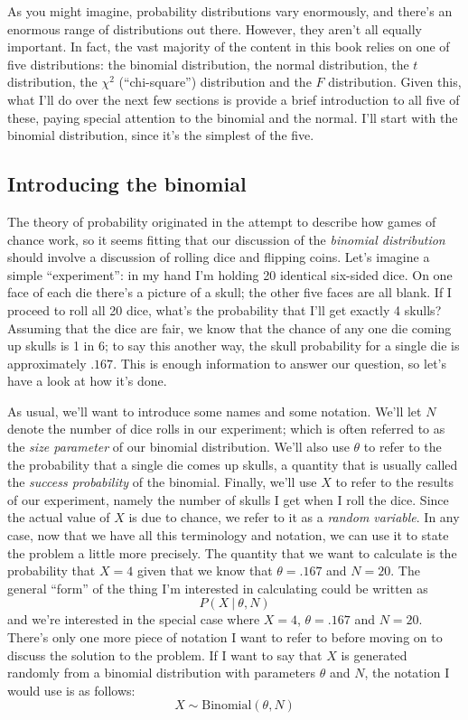 \documentclass[
  letterpaper,
  DIV=11,
  numbers=noendperiod]{scrreprt}
\begin{document}
As you might imagine, probability distributions vary enormously, and
there's an enormous range of distributions out there. However, they
aren't all equally important. In fact, the vast majority of the content
in this book relies on one of five distributions: the binomial
distribution, the normal distribution, the \(t\) distribution, the
\(\chi^2\) (``chi-square'') distribution and the \(F\) distribution.
Given this, what I'll do over the next few sections is provide a brief
introduction to all five of these, paying special attention to the
binomial and the normal. I'll start with the binomial distribution,
since it's the simplest of the five.

\subsection{Introducing the binomial}\label{introducing-the-binomial}

The theory of probability originated in the attempt to describe how
games of chance work, so it seems fitting that our discussion of the
\emph{binomial distribution} should involve a discussion of rolling dice
and flipping coins. Let's imagine a simple ``experiment'': in my hand
I'm holding 20 identical six-sided dice. On one face of each die there's
a picture of a skull; the other five faces are all blank. If I proceed
to roll all 20 dice, what's the probability that I'll get exactly 4
skulls? Assuming that the dice are fair, we know that the chance of any
one die coming up skulls is 1 in 6; to say this another way, the skull
probability for a single die is approximately \(.167\). This is enough
information to answer our question, so let's have a look at how it's
done.

As usual, we'll want to introduce some names and some notation. We'll
let \(N\) denote the number of dice rolls in our experiment; which is
often referred to as the \emph{size parameter} of our binomial
distribution. We'll also use \(\theta\) to refer to the the probability
that a single die comes up skulls, a quantity that is usually called the
\emph{success probability} of the binomial. Finally, we'll use \(X\) to
refer to the results of our experiment, namely the number of skulls I
get when I roll the dice. Since the actual value of \(X\) is due to
chance, we refer to it as a \emph{random variable}. In any case, now
that we have all this terminology and notation, we can use it to state
the problem a little more precisely. The quantity that we want to
calculate is the probability that \(X = 4\) given that we know that
\(\theta = .167\) and \(N=20\). The general ``form'' of the thing I'm
interested in calculating could be written as \[P(X \ | \ \theta, N)\]
and we're interested in the special case where \(X=4\),
\(\theta = .167\) and \(N=20\). There's only one more piece of notation
I want to refer to before moving on to discuss the solution to the
problem. If I want to say that \(X\) is generated randomly from a
binomial distribution with parameters \(\theta\) and \(N\), the notation
I would use is as follows: \[X \sim \mbox{Binomial}(\theta, N)\]
\end{document}
